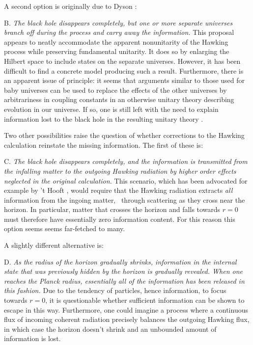 A second option is originally due to Dyson :
\itemskip
\item{B.} {\it The black hole disappears completely, but one or more
separate universes branch off during the process and carry away the
information. }
\itemskip
This proposal appears to neatly accommodate the apparent nonunitarity of the
Hawking process while preserving fundamental unitarity.  It does so by
enlarging
the Hilbert space to include states on the separate universes.  However, it
has been difficult to find a concrete model producing such a result.
Furthermore, there is an apparent issue of principle:  it seems that arguments
similar to those used for baby universes  can
be used to replace the effects of the other universes by
arbitrariness in coupling constants in an otherwise unitary theory
describing evolution in
our universe.  If so,
one is still left with the need to explain
information lost to the black hole in the resulting unitary
theory .

Two other possibilities raise the question of whether corrections to
the Hawking calculation reinstate the missing information.  The first
of these is:
\medskip
\noindent
\item{C.}  {\it The black hole disappears completely, and the information
is transmitted from the infalling matter to the outgoing Hawking
radiation by higher order effects neglected in the original
calculation.  }
\medskip
\noindent
This scenario, which has been advocated for example by 't Hooft ,
would require that the Hawking radiation
extracts {\it all} information from the ingoing matter, \eg\ through scattering
as they cross near the horizon.  In particular, matter that crosses the
horizon and falls towards $r=0$ must therefore have essentially zero
information
content.  For this reason this option seems
seems far-fetched to many.

A slightly different alternative  is:

\itemskip
\item{D.}  {\it As the radius of the horizon gradually shrinks,
information in the internal state that was previously hidden by the
horizon is gradually revealed.  When one reaches the Planck radius,
essentially all of the information has been released in this
fashion.}
\itemskip
Due to the tendency of particles, hence information, to focus towards
$r=0$, it is questionable whether sufficient information can be shown
to escape in this way.  Furthermore, one could imagine a process where a
continuous flux of incoming coherent radiation precisely balances the outgoing
Hawking flux, in which case the horizon doesn't shrink and an unbounded
amount of information is lost.

